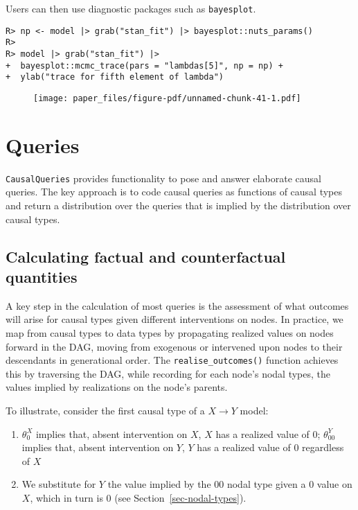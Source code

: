 \documentclass[
  11pt,
  article]{jss}
\providecommand{\tightlist}{%
  \setlength{\itemsep}{0pt}\setlength{\parskip}{0pt}}\usepackage{longtable,booktabs,array}
\begin{document}
Users can then use diagnostic packages such as \texttt{bayesplot}.

\begin{verbatim}
R> np <- model |> grab("stan_fit") |> bayesplot::nuts_params()
R> 
R> model |> grab("stan_fit") |>
+  bayesplot::mcmc_trace(pars = "lambdas[5]", np = np) +
+  ylab("trace for fifth element of lambda")
\end{verbatim}

\begin{figure}[H]

{\centering \texttt{[image: paper\_files/figure-pdf/unnamed-chunk-41-1.pdf]}

}

\end{figure}

\hypertarget{sec-query}{%
\section{Queries}\label{sec-query}}

\texttt{CausalQueries} provides functionality to pose and answer
elaborate causal queries. The key approach is to code causal queries as
functions of causal types and return a distribution over the queries
that is implied by the distribution over causal types.

\hypertarget{sec-propagation}{%
\subsection{Calculating factual and counterfactual
quantities}\label{sec-propagation}}

A key step in the calculation of most queries is the assessment of what
outcomes will arise for causal types given different interventions on
nodes. In practice, we map from causal types to data types by
propagating realized values on nodes forward in the DAG, moving from
exogenous or intervened upon nodes to their descendants in generational
order. The \texttt{realise\_outcomes()} function achieves this by
traversing the DAG, while recording for each node's nodal types, the
values implied by realizations on the node's parents.

To illustrate, consider the first causal type of a \(X \rightarrow Y\)
model:

\begin{enumerate}
\def\labelenumi{\arabic{enumi}.}
\tightlist
\item
  \(\theta^X_0\) implies that, absent intervention on \(X\), \(X\) has a
  realized value of \(0\); \(\theta^Y_{00}\) implies that, absent
  intervention on \(Y\), \(Y\) has a realized value of \(0\) regardless
  of \(X\)
\item
  We substitute for \(Y\) the value implied by the \(00\) nodal type
  given a \(0\) value on \(X\), which in turn is \(0\) (see
  Section~\ref{sec-nodal-types}).
\end{enumerate}
\end{document}
